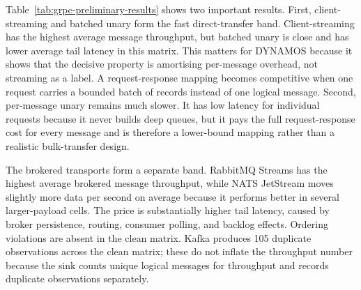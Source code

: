 \begin{table}[!t]
    \centering
    \footnotesize
    \caption{Single-node synthetic-clean summary across six transports, averaged over ten repetitions, four payload sizes, and four concurrency levels.}
    \label{tab:grpc-preliminary-results}
\end{table}

Table~\ref{tab:grpc-preliminary-results} shows two important results. First, client-streaming and batched unary form the fast direct-transfer band. Client-streaming has the highest average message throughput, but batched unary is close and has lower average tail latency in this matrix. This matters for DYNAMOS because it shows that the decisive property is amortising per-message overhead, not streaming as a label. A request-response mapping becomes competitive when one request carries a bounded batch of records instead of one logical message. Second, per-message unary remains much slower. It has low latency for individual requests because it never builds deep queues, but it pays the full request-response cost for every message and is therefore a lower-bound mapping rather than a realistic bulk-transfer design.

The brokered transports form a separate band. RabbitMQ Streams has the highest average brokered message throughput, while NATS JetStream moves slightly more data per second on average because it performs better in several larger-payload cells. The price is substantially higher tail latency, caused by broker persistence, routing, consumer polling, and backlog effects. Ordering violations are absent in the clean matrix. Kafka produces 105 duplicate observations across the clean matrix; these do not inflate the throughput number because the sink counts unique logical messages for throughput and records duplicate observations separately.

